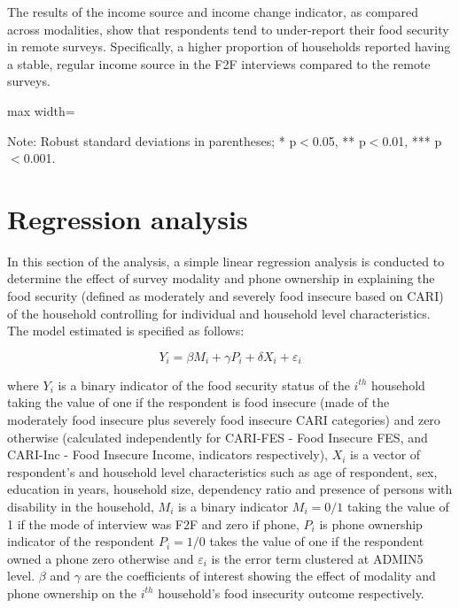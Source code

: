 \documentclass[11pt,harvard]{article}
\begin{document}
	The results of the income source and income change indicator, as compared across modalities, show that respondents tend to under-report their food security in remote surveys. Specifically, a higher proportion of households reported having a stable, regular income source in the F2F interviews compared to the remote surveys. 
	
	\begin{table}[htbp]
		\centering
		\begin{adjustbox}{max width=\textwidth}
			\begin{threeparttable}
				\caption{Impact of Survey Modality on Income}
				\scriptsize%
				 
				\label{tab:INC_Modality_BF}
				\begin{tablenotes}
					\item Note: Robust standard deviations in parentheses; * p$<$0.05, ** p$<$0.01, *** p$<$0.001.
				\end{tablenotes}
			\end{threeparttable}
		\end{adjustbox}
	\end{table}
	
	
	
	
	

	\pagebreak
	
	
	\section{Regression analysis}
	
	In this section of the analysis, a simple linear regression analysis is conducted to determine the effect of survey modality and phone ownership in explaining the food security (defined as moderately and severely food insecure based on CARI) of the household controlling for individual and household level characteristics. The model estimated is specified as follows:
	
	\[Y_{i}=\beta M_{i}+ \gamma P_{i}+ \delta X_{i}+ \varepsilon_{i} \tag{1}\] 
	
	where \(Y_{i}\) is a binary indicator of the food security status of the \(i^{th}\) household taking the value of one if the respondent is food insecure (made of the moderately food insecure plus severely food insecure CARI categories) and zero otherwise (calculated independently for CARI-FES - Food Insecure FES, and CARI-Inc - Food Insecure Income, indicators respectively), \(X_{i}\) is a vector of respondent's and household level characteristics such as age of respondent, sex, education in years, household size, dependency ratio and presence of persons with disability in the household, \(M_{i}\) is a binary indicator \(M_{i}=0/1\) taking the value of 1 if the mode of interview was F2F and zero if  phone, \(P_{i}\) is phone ownership indicator of the respondent \(P_{i}=1/0\) takes the value of one if the respondent owned a phone zero otherwise and \(\varepsilon_{i}\) is the error term clustered at ADMIN5 level. \(\beta\) and \(\gamma\) are the coefficients of interest showing the effect of modality and phone ownership on the \(i^{th}\) household's food insecurity outcome respectively.
	
\end{document}
